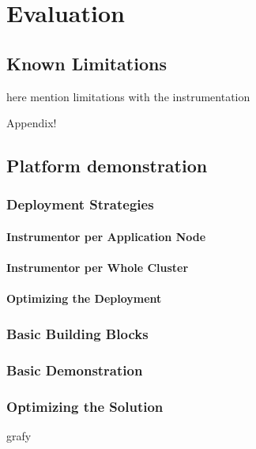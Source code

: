 \chapter{Evaluation}
\label{chap:evaluation}
\section{Known Limitations}
here mention limitations with the instrumentation


Appendix!
\section{Platform demonstration}
\subsection{Deployment Strategies}
\subsubsection{Instrumentor per Application Node}
\subsubsection{Instrumentor per Whole Cluster}
\subsubsection{Optimizing the Deployment}
\subsection{Basic Building Blocks}
\subsection{Basic Demonstration}
\subsection{Optimizing the Solution}

grafy